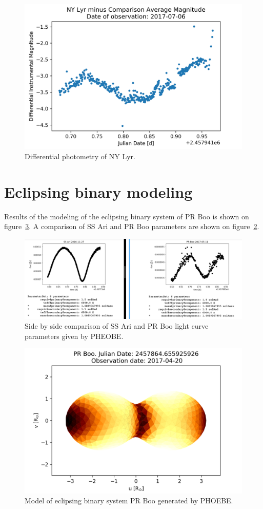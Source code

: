 \begin{figure}[h]
    \centering
    \includegraphics{figures/nylyr170706POS.png}
    \caption{Differential photometry of NY Lyr.}
\label{fig:nyPOS}
\end{figure}

\section{Eclipsing binary modeling}
Results of the modeling of the eclipsing binary system of PR Boo is shown on figure~\ref{fig:phoebeprboo}.
A comparison of SS Ari and PR Boo parameters are shown on figure~\ref{fig:phoebecompare}.

\begin{figure}[h]
    \centering
    \includegraphics[width=\columnwidth]{figures/phoebecompare.png}
    \caption{Side by side comparison of SS Ari and PR Boo light curve parameters given by PHEOBE.}
\label{fig:phoebecompare}
\end{figure}

\begin{figure}[h]
    \centering
    \includegraphics[width=\columnwidth]{figures/phoebeprboo.png}
    \caption{Model of eclipsing binary system PR Boo generated by PHOEBE.}
\label{fig:phoebeprboo}
\end{figure}
